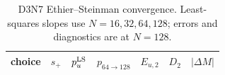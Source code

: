 \begin{table}[htbp]

\centering
\footnotesize
\setlength{\tabcolsep}{3.8pt}
\caption{D3N7 Ethier--Steinman convergence.  Least-squares slopes use
$N=16,32,64,128$; errors and diagnostics are at $N=128$.}
\label{tab:numerical-ethier-convergence}
\begin{tabular}{@{}lrrrrrr@{}}
\toprule
choice & $s_{+}$ & $p_u^{\rm LS}$ & $p_{64\to128}$ & $E_{u,2}$ & $D_2$ & $|\Delta M|$\\
\midrule
\bottomrule
\end{tabular}
\end{table}
